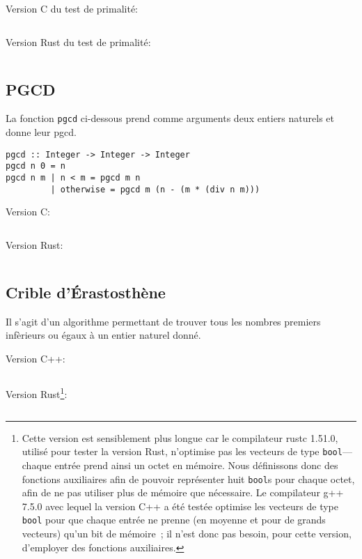 \medskip

\noindent Version C du test de primalité: 
\inputminted{C}{Ensembles_Arithmétique/Code/is_prime.c}

\medskip

\noindent Version Rust du test de primalité: 
\inputminted{Rust}{Ensembles_Arithmétique/Code/is_prime.rs}

\subsection{PGCD}
\label{app:Haskell_pgcd}

\noindent 
La fonction \texttt{pgcd} ci-dessous prend comme arguments deux entiers naturels et donne leur pgcd.
\begin{verbatim}
pgcd :: Integer -> Integer -> Integer
pgcd n 0 = n
pgcd n m | n < m = pgcd m n
         | otherwise = pgcd m (n - (m * (div n m)))
\end{verbatim}

\medskip

\noindent Version C: 
\inputminted{C}{Ensembles_Arithmétique/Code/pgcd.c}

\medskip

\noindent Version Rust: 
\inputminted{Rust}{Ensembles_Arithmétique/Code/pgcd.rs}

\subsection{Crible d'Érastosthène}
\label{app:code_erastosthene}

Il s'agit d'un algorithme permettant de trouver tous les nombres premiers infèrieurs ou égaux à un entier naturel donné.

\bigskip

\noindent Version C++: 
\inputminted{C++}{Ensembles_Arithmétique/Code/Érastosthène.cpp}

\bigskip

\noindent Version Rust\footnote{
    Cette version est sensiblement plus longue car le compilateur rustc 1.51.0, utilisé pour tester la version Rust, n'optimise pas les vecteurs de type \texttt{bool}—chaque entrée prend ainsi un octet en mémoire. 
    Nous définissons donc des fonctions auxiliaires afin de pouvoir représenter huit \texttt{bool}s pour chaque octet, afin de ne pas utiliser plus de mémoire que nécessaire.
    Le compilateur g++ 7.5.0 avec lequel la version C++ a été testée optimise les vecteurs de type \texttt{bool} pour que chaque entrée ne prenne (en moyenne et pour de grands vecteurs) qu'un bit de mémoire ; il n'est donc pas besoin, pour cette version, d'employer des fonctions auxiliaires. 
}: 
\inputminted{Rust}{Ensembles_Arithmétique/Code/Érastosthène.rs}
